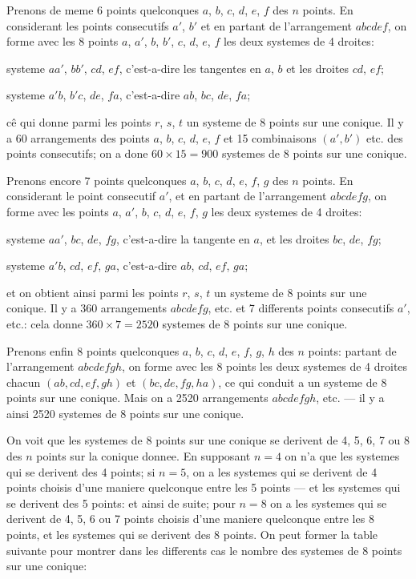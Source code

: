 \documentclass[11pt,a4paper]{article}
\theoremstyle{plain}
\begin{document}
Prenons de meme 6 points quelconques $a$, $b$, $c$, $d$, $e$, $f$ des $n$ points. En considerant les points consecutifs $a'$, $b'$ et en partant de l'arrangement $abcdef$, on forme avec les 8 points $a$, $a'$, $b$, $b'$, $c$, $d$, $e$, $f$ les deux systemes de 4 droites:

systeme $aa'$, $bb'$, $cd$, $ef$, c'est-a-dire les tangentes en $a$, $b$ et les droites $cd$, $ef$;

systeme $a'b$, $b'c$, $de$, $fa$, c'est-a-dire $ab$, $bc$, $de$, $fa$;

c\^e qui donne parmi les points $r$, $s$, $t$ un systeme de 8 points sur une conique. Il y a 60 arrangements des points $a$, $b$, $c$, $d$, $e$, $f$ et 15 combinaisons $(a', b')$ etc. des points consecutifs; on a done $60 \times 15 = 900$ systemes de 8 points sur une conique.

Prenons encore 7 points quelconques $a$, $b$, $c$, $d$, $e$, $f$, $g$ des $n$ points. En considerant le point consecutif $a'$, et en partant de l'arrangement $abcdefg$, on forme avec les points $a$, $a'$, $b$, $c$, $d$, $e$, $f$, $g$ les deux systemes de 4 droites:

systeme $aa'$, $bc$, $de$, $fg$, c'est-a-dire la tangente en $a$, et les droites $bc$, $de$, $fg$;

systeme $a'b$, $cd$, $ef$, $ga$, c'est-a-dire $ab$, $cd$, $ef$, $ga$;

et on obtient ainsi parmi les points $r$, $s$, $t$ un systeme de 8 points sur une conique. Il y a 360 arrangements $abcdefg$, etc. et 7 differents points consecutifs $a'$, etc.: cela donne $360 \times 7 = 2520$ systemes de 8 points sur une conique.

Prenons enfin 8 points quelconques $a$, $b$, $c$, $d$, $e$, $f$, $g$, $h$ des $n$ points: partant de l'arrangement $abcdefgh$, on forme avec les 8 points les deux systemes de 4 droites chacun $(ab, cd, ef, gh)$ et $(bc, de, fg, ha)$, ce qui conduit a un systeme de 8 points sur une conique. Mais on a 2520 arrangements $abcdefgh$, etc. --- il y a ainsi 2520 systemes de 8 points sur une conique.

On voit que les systemes de 8 points sur une conique se derivent de 4, 5, 6, 7 ou 8 des $n$ points sur la conique donnee. En supposant $n = 4$ on n'a que les systemes qui se derivent des 4 points; si $n = 5$, on a les systemes qui se derivent de 4 points choisis d'une maniere quelconque entre les 5 points --- et les systemes qui se derivent des 5 points: et ainsi de suite; pour $n = 8$ on a les systemes qui se derivent de 4, 5, 6 ou 7 points choisis d'une maniere quelconque entre les 8 points, et les systemes qui se derivent des 8 points. On peut former la table suivante pour montrer dans les differents cas le nombre des systemes de 8 points sur une conique:
\end{document}
